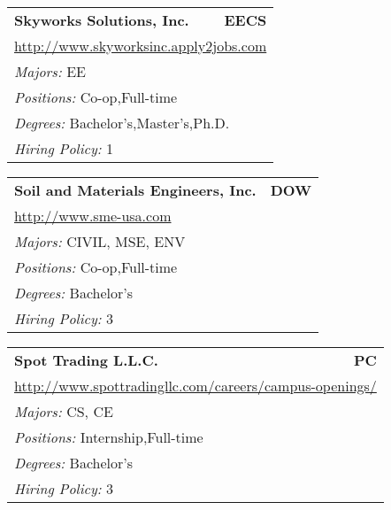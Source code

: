 \documentclass[twoside]{article}
\begin{document}
\begin{center}
\begin{multicols}{3}
\begin{FlushLeft}
\begin{minipage}{.9\columnwidth}
\end{minipage}
 
\begin{minipage}{.9\columnwidth}\begin{tabularx}{.95\columnwidth}{Xr}
                 {\Large\bf Skyworks Solutions, Inc.} & {\Large\bf EECS}\\
    \multicolumn{2}{p{.95\columnwidth}}{\url{http://www.skyworksinc.apply2jobs.com}}\\
    \multicolumn{2}{p{.95\columnwidth}}{\emph{Majors:} EE}\\
    \multicolumn{2}{p{.95\columnwidth}}{\emph{Positions:} Co-op,Full-time}\\
    \multicolumn{2}{p{.95\columnwidth}}{\emph{Degrees:} Bachelor's,Master's,Ph.D.}\\
    \multicolumn{2}{p{.95\columnwidth}}{\emph{Hiring Policy:} 1}\\
    \end{tabularx}
    
\end{minipage}
 
\begin{minipage}{.9\columnwidth}\begin{tabularx}{.95\columnwidth}{Xr}
                 {\Large\bf Soil and Materials Engineers, Inc.} & {\Large\bf DOW}\\
    \multicolumn{2}{p{.95\columnwidth}}{\url{http://www.sme-usa.com}}\\
    \multicolumn{2}{p{.95\columnwidth}}{\emph{Majors:} CIVIL, MSE, ENV}\\
    \multicolumn{2}{p{.95\columnwidth}}{\emph{Positions:} Co-op,Full-time}\\
    \multicolumn{2}{p{.95\columnwidth}}{\emph{Degrees:} Bachelor's}\\
    \multicolumn{2}{p{.95\columnwidth}}{\emph{Hiring Policy:} 3}\\
    \end{tabularx}
    
\end{minipage}
 
\begin{minipage}{.9\columnwidth}\begin{tabularx}{.95\columnwidth}{Xr}
                 {\Large\bf Spot Trading L.L.C.} & {\Large\bf PC}\\
    \multicolumn{2}{p{.95\columnwidth}}{\url{http://www.spottradingllc.com/careers/campus-openings/}}\\
    \multicolumn{2}{p{.95\columnwidth}}{\emph{Majors:} CS, CE}\\
    \multicolumn{2}{p{.95\columnwidth}}{\emph{Positions:} Internship,Full-time}\\
    \multicolumn{2}{p{.95\columnwidth}}{\emph{Degrees:} Bachelor's}\\
    \multicolumn{2}{p{.95\columnwidth}}{\emph{Hiring Policy:} 3}\\
    \end{tabularx}
    

\end{minipage}
\end{FlushLeft}
\end{multicols}
\end{center}
\end{document}
